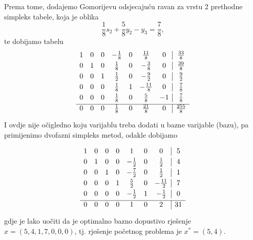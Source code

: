 \documentclass[a4paper, utf8, 11pt, colorlinks]{book}
\theoremstyle{definition}
\begin{document}
Prema tome, dodajemo Gomorijevu odsjecajuću ravan za vrstu 2 prethodne simpleks tabele, koja je oblika
$$  \frac{1}{8}s_2 + \frac{5}{8} y_2 - y_3 = \frac{7}{8},$$
te dobijamo tabelu
$$ \begin{array}{ccccccc| c}\vspace{1mm}
1    &   0   &   0   &  -\frac{1}{8}   &   0    &    \frac{11}{8}    & 0 & \frac{33}{8} \\\vspace{1mm}
0    &   1   &   0   &   \frac{1}{8}   &   0    &    -\frac{3}{8}    & 0 & \frac{39}{8} \\\vspace{1mm}
0    &   0   &   1   &   \frac{1}{2}   &   0    &    - \frac{9}{2}   & 0 & \frac{9}{2} \\\vspace{1mm}
0    &   0   &   0   &   \frac{1}{8}   &   1    &    - \frac{11}{8}  & 0    & \frac{7}{8} \\ \vspace{1mm}
0    &   0   &   0   &   \frac{1}{8}   &   0    &    \frac{5}{8}     & -1 & \frac{7}{8} \\ \hline\vspace{1mm}
0    &   0   &   0   &   \frac{1}{8}   &   0    &     \frac{21}{8}   & 0 & \frac{255}{8}   
\end{array} $$
I ovdje nije očigledno koju   varijablu treba dodati u bazne varijable (bazu), pa primijenimo dvofazni simpleks metod, odakle dobijamo 

$$ \begin{array}{ccccccc| c}\vspace{1mm}
    1    &   0   &   0   &  0 &  1  &   0    &    0    & 5  \\\vspace{1mm}
0    &   1   &   0   &  0   &   -\frac{1}{2}    &   0   & \frac{1}{2} & 4 \\\vspace{1mm}
0    &   0   &   1   &  0   &   -\frac{7}{2}    &   0   & \frac{1}{2} & 1 \\\vspace{1mm}
0    &   0   &   0   &  1  &   \frac{5}{2}    &  0 &  -\frac{11}{2}    & 7 \\ \vspace{1mm}
0    &   0   &   0   &   0 &  -\frac{1}{2}    &   1   & - \frac{1}{2} & 0\\ \hline\vspace{1mm}
0    &   0   &   0   &  0  &   1    &    0   & 2 & 31  
\end{array} 
$$
gdje je lako uočiti da je optimalno bazno dopustivo rješenje $x=(5, 4, 1, 7, 0, 0, 0 )$, tj. rješenje početnog problema je $x^*=(5, 4)$.
\end{document}

